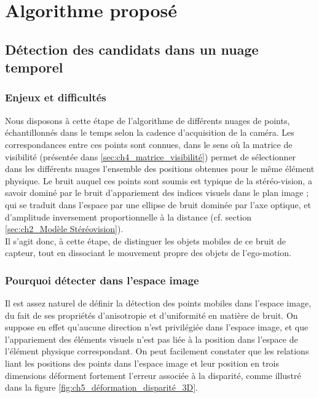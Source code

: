 \section{Algorithme proposé} \label{sec:ch5_methode_proposée}
\subsection{Détection des candidats dans un nuage temporel} \label{sec:ch5_Détection_candidats}
\subsubsection{Enjeux et difficultés}
Nous disposons à cette étape de l'algorithme de différents nuages de points, échantillonnés dans le temps selon la cadence d'acquisition de la caméra. Les correspondances entre ces points sont connues, dans le sens où la matrice de visibilité (présentée dans \ref{sec:ch4_matrice_visibilité}) permet de sélectionner dans les différents nuages l'ensemble des positions obtenues pour le même élément physique. Le bruit auquel ces points sont soumis est typique de la stéréo-vision, a savoir dominé par le bruit d'appariement des indices visuels dans le plan image ; qui se traduit dans l'espace par une ellipse de bruit dominée par l'axe optique, et d'amplitude inversement proportionnelle à la distance (cf. section \ref{sec:ch2_Modèle Stéréovision}).\\
Il s'agit donc, à cette étape, de distinguer les objets mobiles de ce bruit de capteur, tout en dissociant le mouvement propre des objets de l'ego-motion.

\subsubsection{Pourquoi détecter dans l'espace image}
Il est assez naturel de définir la détection des points mobiles dans l'espace image, du fait de ses propriétés d'anisotropie et d'uniformité en matière de bruit. On suppose en effet qu'aucune direction n'est privilégiée dans l'espace image, et que l'appariement des éléments visuels n'est pas liée à la position dans l'espace de l'élément physique correspondant. On peut facilement constater que les relations liant les positions des points dans l'espace image et leur position en trois dimensions déforment fortement l'erreur associée à la disparité, comme illustré dans la figure \ref{fig:ch5_déformation_disparité_3D}.


